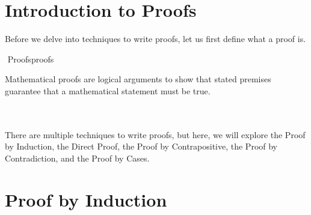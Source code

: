 \section{Introduction to Proofs}
    
    Before we delve into techniques to write proofs, let us first define what a proof is. 
    \begin{definition}{\Stop\,\,Proofs}{proofs}
    
        Mathematical proofs are logical arguments to show that stated premises guarantee that a mathematical statement must be true.
    
    \end{definition}
    \vphantom
    \\
    \\
    There are multiple techniques to write proofs, but here, we will explore the Proof by Induction, the Direct Proof, the Proof by Contrapositive, the Proof by Contradiction, and the Proof by Cases.
    
\section{Proof by Induction}

